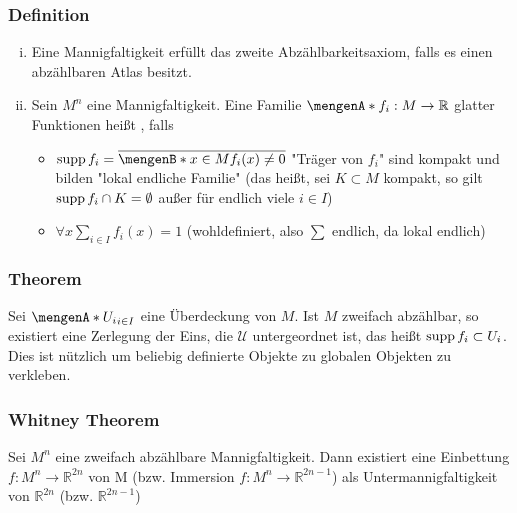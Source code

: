 \subsubsection{Definition}
\label{ssub:121}
\begin{enumerate}[(i)]
	\item Eine Mannigfaltigkeit erfüllt das zweite Abzählbarkeitsaxiom, falls es einen abzählbaren Atlas besitzt.
	\item Sein $M^n$ eine Mannigfaltigkeit. Eine Familie $\set{f_i:M\to \mathds{R}}$ glatter Funktionen heißt , falls
	\begin{itemize}
		\item $\supp f_i = \overline{\set[x\in M]{f_i(x) \neq 0}}$ "Träger von $f_i$" sind kompakt und bilden "lokal endliche Familie" (das heißt, sei $K\subset M$ kompakt, so gilt $\operatorname{supp} f_i \cap K = \emptyset$ außer für endlich viele $i\in I$)
		\item $\forall x \sum_{i\in I} f_i(x) = 1$ (wohldefiniert, also $\sum$ endlich, da lokal endlich)
	\end{itemize}
\end{enumerate}

\subsubsection{Theorem}
\label{ssub:122}
Sei $\set{U_i}_{i\in I}$ eine Überdeckung von $M$. Ist $M$ zweifach abzählbar, so existiert eine Zerlegung der Eins, die $\mathcal{U}$ untergeordnet ist, das heißt $\operatorname{supp} f_i \subset U_i$. Dies ist nützlich um beliebig definierte Objekte zu globalen Objekten zu verkleben.

\subsubsection{Whitney Theorem}
\label{ssub:123}
Sei $M^n$ eine zweifach abzählbare Mannigfaltigkeit. Dann existiert eine Einbettung $f:M^n\to \mathds{R}^{2n}$ von M (bzw. Immersion $f:M^n\to \mathds{R}^{2n-1}$) als Untermannigfaltigkeit von $\mathds{R}^{2n}$ (bzw. $\mathds{R}^{2n-1}$)

